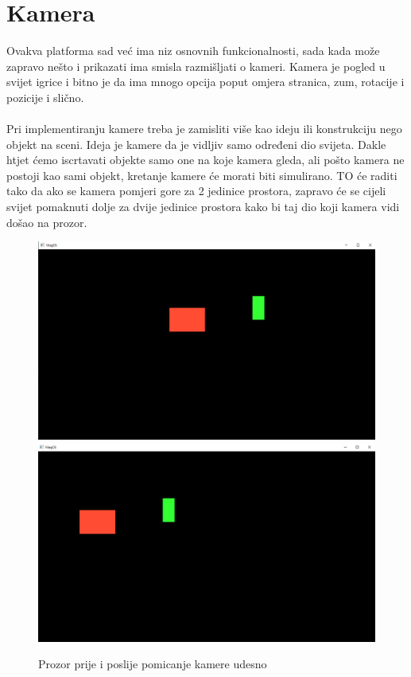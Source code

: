 \documentclass{mathos}
\begin{document}
\section{Kamera}\label{ss_kamera}
Ovakva platforma sad već ima niz osnovnih funkcionalnosti, sada kada može zapravo nešto i prikazati ima smisla razmišljati o kameri. Kamera je pogled u svijet igrice i bitno je
da ima mnogo opcija poput omjera stranica, zum, rotacije i pozicije i slično.
\\ \\
Pri implementiranju kamere treba je zamisliti više kao ideju ili konstrukciju nego objekt na sceni. Ideja je kamere da je vidljiv samo određeni dio svijeta. Dakle htjet ćemo
iscrtavati objekte samo one na koje kamera gleda, ali pošto kamera ne postoji kao sami objekt, kretanje kamere će morati biti simulirano. TO će raditi tako da ako se kamera
pomjeri gore za 2 jedinice prostora, zapravo će se cijeli svijet pomaknuti dolje za dvije jedinice prostora kako bi taj dio koji kamera vidi došao na prozor.

\begin{figure}[H]
    \centering
    \includegraphics[scale=0.3]{Slike/Rectangles.png}
    \includegraphics[scale=0.3]{Slike/RectanglesMoved.png}
    \caption{Prozor prije i poslije pomicanje kamere udesno}
    \label{im_sijenčar}
\end{figure}
\end{document}

